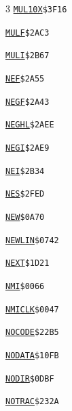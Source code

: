\begin{multicols}{3}
\noindent\hyperlink{l:MUL10X}{\texttt{MUL10X}}\hfill\texttt{\$3F16~\phantom{000}\llap{\pageref{l:MUL10X}}}\par
\noindent\hyperlink{l:MULF}{\texttt{MULF}}\hfill\texttt{\$2AC3~\phantom{000}\llap{\pageref{l:MULF}}}\par
\noindent\hyperlink{l:MULI}{\texttt{MULI}}\hfill\texttt{\$2B67~\phantom{000}\llap{\pageref{l:MULI}}}\par
\noindent\hyperlink{l:NEF}{\texttt{NEF}}\hfill\texttt{\$2A55~\phantom{000}\llap{\pageref{l:NEF}}}\par
\noindent\hyperlink{l:NEGF}{\texttt{NEGF}}\hfill\texttt{\$2A43~\phantom{000}\llap{\pageref{l:NEGF}}}\par
\noindent\hyperlink{l:NEGHL}{\texttt{NEGHL}}\hfill\texttt{\$2AEE~\phantom{000}\llap{\pageref{l:NEGHL}}}\par
\noindent\hyperlink{l:NEGI}{\texttt{NEGI}}\hfill\texttt{\$2AE9~\phantom{000}\llap{\pageref{l:NEGI}}}\par
\noindent\hyperlink{l:NEI}{\texttt{NEI}}\hfill\texttt{\$2B34~\phantom{000}\llap{\pageref{l:NEI}}}\par
\noindent\hyperlink{l:NES}{\texttt{NES}}\hfill\texttt{\$2FED~\phantom{000}\llap{\pageref{l:NES}}}\par
\noindent\hyperlink{l:NEW}{\texttt{NEW}}\hfill\texttt{\$0A70~\phantom{000}\llap{\pageref{l:NEW}}}\par
\noindent\hyperlink{l:NEWLIN}{\texttt{NEWLIN}}\hfill\texttt{\$0742~\phantom{000}\llap{\pageref{l:NEWLIN}}}\par
\noindent\hyperlink{l:NEXT}{\texttt{NEXT}}\hfill\texttt{\$1D21~\phantom{000}\llap{\pageref{l:NEXT}}}\par
\noindent\hyperlink{l:NMI}{\texttt{NMI}}\hfill\texttt{\$0066~\phantom{000}\llap{\pageref{l:NMI}}}\par
\noindent\hyperlink{l:NMICLK}{\texttt{NMICLK}}\hfill\texttt{\$0047~\phantom{000}\llap{\pageref{l:NMICLK}}}\par
\noindent\hyperlink{l:NOCODE}{\texttt{NOCODE}}\hfill\texttt{\$22B5~\phantom{000}\llap{\pageref{l:NOCODE}}}\par
\noindent\hyperlink{l:NODATA}{\texttt{NODATA}}\hfill\texttt{\$10FB~\phantom{000}\llap{\pageref{l:NODATA}}}\par
\noindent\hyperlink{l:NODIR}{\texttt{NODIR}}\hfill\texttt{\$0DBF~\phantom{000}\llap{\pageref{l:NODIR}}}\par
\noindent\hyperlink{l:NOTRAC}{\texttt{NOTRAC}}\hfill\texttt{\$232A~\phantom{000}\llap{\pageref{l:NOTRAC}}}\par

\end{multicols}
